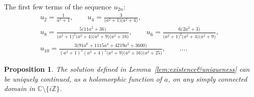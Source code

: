 \documentclass[pdftex]{sigma}
\numberwithin{equation}{section}
\newtheorem{Proposition}[Theorem]{Proposition}
 { \theoremstyle{definition}
\newtheorem{Remark}[Theorem]{Remark} }
\begin{document}
The first few terms of the sequence $u_{2n}$:
\begin{gather*}
u_{2}=\frac{1}{a^2+1},\qquad u_{4}=\frac{3}{\big(a^2+1\big)\big(a^2+4\big)},\\
 u_{8}=\frac{5 \big(11 a^2+36\big)}{\big(a^2+1\big)^2\big(a^2+4\big)\big(a^2+9\big)\big(a^2+16\big)},\qquad
u_{6}=\frac{6 \big(2 a^2+3\big)}{\big(a^2+1\big)^2\big(a^2+4\big)\big(a^2+9\big)},\\
u_{10}=\frac{3 \big(91 a^6+1115 a^4+4219 a^2+3600\big)}{(a^2+1)^3(a^2+4)^2\big(a^2+9\big)\big(a^2+16\big)\big(a^2+25\big)},\qquad \ldots.
\end{gather*}
\begin{Proposition}\label{prop:taylor-general}
The solution defined in Lemma~{\rm \ref{lem:existence&uniqueness}} can be uniquely continued, as a holomorphic function
of $a$, on any simply connected domain in $\mathbb C{\setminus}\{i\mathbb Z\}$.
\end{Proposition}
\end{document}
